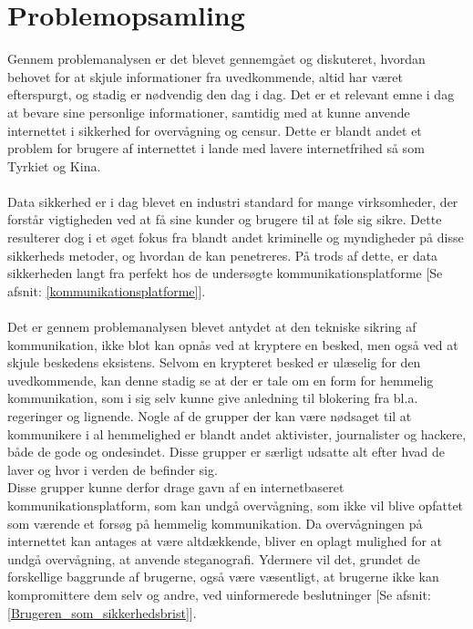 \section{Problemopsamling}
Gennem problemanalysen er det blevet gennemgået og diskuteret, hvordan behovet for at skjule informationer fra uvedkommende, altid har været efterspurgt, og stadig er nødvendig den dag i dag. Det er et relevant emne i dag at bevare sine personlige informationer, samtidig med at kunne anvende internettet i sikkerhed for overvågning og censur. Dette er blandt andet et problem for brugere af internettet i lande med lavere internetfrihed så som Tyrkiet og Kina.\cite{FreedomHouseRapport2017}
\\\\
Data sikkerhed er i dag blevet en industri standard for mange virksomheder, der forstår vigtigheden ved at få sine kunder og brugere til at føle sig sikre. Dette resulterer dog i et øget fokus fra blandt andet kriminelle og myndigheder på disse sikkerheds metoder, og hvordan de kan penetreres. På trods af dette, er data sikkerheden langt fra perfekt hos de undersøgte kommunikationsplatforme [Se afsnit: \ref{kommunikationsplatforme}].
\\\\
Det er gennem problemanalysen blevet antydet at den tekniske sikring af kommunikation, ikke blot kan opnås ved at kryptere en besked, men også ved at skjule beskedens eksistens. Selvom en krypteret besked er ulæselig for den uvedkommende, kan denne stadig se at der er tale om en form for hemmelig kommunikation, som i sig selv kunne give anledning til blokering fra bl.a. regeringer og lignende. Nogle af de grupper der kan være nødsaget til at kommunikere i al hemmelighed er blandt andet aktivister, journalister og hackere, både de gode og ondesindet. Disse grupper er særligt udsatte alt efter hvad de laver og hvor i verden de befinder sig.\cite{FreedomHouseRapport2017}
\\
Disse grupper kunne derfor drage gavn af en internetbaseret kommunikationsplatform, som kan undgå overvågning, som ikke vil blive opfattet som værende et forsøg på hemmelig kommunikation. 
Da overvågningen på internettet kan antages at være altdækkende, bliver en oplagt mulighed for at undgå overvågning, at anvende steganografi. Ydermere vil det, grundet de forskellige baggrunde af brugerne, også være væsentligt, at brugerne ikke kan kompromittere dem selv og andre, ved uinformerede beslutninger [Se afsnit: \ref{Brugeren_som_sikkerhedsbrist}].